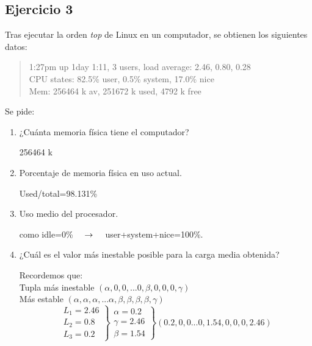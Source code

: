 \subsection{Ejercicio 3}
\noindent
Tras ejecutar la orden \textit{top} de Linux en un computador, se obtienen los siguientes datos:\\
\begin{quote}
    1:27pm up 1day 1:11, 3 users, load average: 2.46, 0.80, 0.28\\
    CPU states: 82.5\% user, 0.5\% system, 17.0\% nice\\
    Mem: 256464 k av, 251672 k used, 4792 k free\\
\end{quote}

Se pide:
\begin{enumerate}
    \item ¿Cuánta memoria física tiene el computador?
\begin{tcolorbox}[colback=white,colframe=cyan!50!black,fonttitle=\bfseries]
256464 k
\end{tcolorbox}    
    \item Porcentaje de memoria física en uso actual.
\begin{tcolorbox}[colback=white,colframe=cyan!50!black,fonttitle=\bfseries]
Used/total=98.131\%
\end{tcolorbox}    
    \item Uso medio del procesador.
\begin{tcolorbox}[colback=white,colframe=cyan!50!black,fonttitle=\bfseries]
como idle=0\% $\quad\rightarrow\quad$ user+system+nice=100\%.
\end{tcolorbox}    
    \item ¿Cuál es el valor más inestable posible para la carga media obtenida?
\begin{tcolorbox}[colback=white,colframe=cyan!50!black,fonttitle=\bfseries]
Recordemos que:\\
Tupla más inestable $(\alpha,0,0,...0,\beta,0,0,0,\gamma)$\\
Más estable $(\alpha,\alpha,\alpha,...\alpha,\beta,\beta,\beta,\beta,\gamma)$
\[\left.\begin{array}{lll}
L_1=2.46\\
L_2=0.8\\
L_3=0.2
\end{array}\right\rbrace\left.\begin{array}{lll}
\alpha=0.2\\
\gamma=2.46\\
\beta=1.54
\end{array}\right\rbrace(0{.}2,0,0...0,1{.}54,0,0,0,2{.}46)
\]
\end{tcolorbox}    
\end{enumerate}
